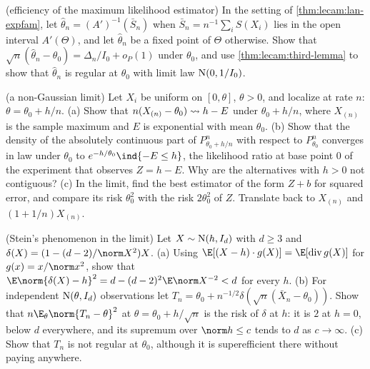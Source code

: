 \begin{refsection}
\begin{exercises}
\item \consolidation (efficiency of the maximum likelihood estimator) In the setting of \cref{thm:lecam:lan-expfam}, let $\hat\theta_n=(A')^{-1}(\bar S_n)$ when $\bar S_n=n^{-1}\sum_iS(X_i)$ lies in the open interval $A'(\Theta)$, and let $\hat\theta_n$ be a fixed point of $\Theta$ otherwise. Show that $\sqrt n(\hat\theta_n-\theta_0)=\Delta_n/I_0+o_P(1)$ under $\theta_0$, and use \cref{thm:lecam:third-lemma} to show that $\hat\theta_n$ is regular at $\theta_0$ with limit law $\mathrm{N}(0,1/I_0)$.\label{ex:lecam:mle}

\item \transfer (a non-Gaussian limit) Let $X_i$ be uniform on $[0,\theta]$, $\theta>0$, and localize at rate $n$: $\theta=\theta_0+h/n$. (a) Show that $n(X_{(n)}-\theta_0)\rightsquigarrow h-E$ under $\theta_0+h/n$, where $X_{(n)}$ is the sample maximum and $E$ is exponential with mean $\theta_0$. (b) Show that the density of the absolutely continuous part of $P^n_{\theta_0+h/n}$ with respect to $P^n_{\theta_0}$ converges in law under $\theta_0$ to $e^{-h/\theta_0}\ind\{-E\le h\}$, the likelihood ratio at base point $0$ of the experiment that observes $Z=h-E$. Why are the alternatives with $h>0$ not contiguous? (c) In the limit, find the best estimator of the form $Z+b$ for squared error, and compare its risk $\theta_0^2$ with the risk $2\theta_0^2$ of $Z$. Translate back to $X_{(n)}$ and $(1+1/n)X_{(n)}$.\label{ex:lecam:uniform}

\item \transfer\hard (Stein's phenomenon in the limit) Let $X\sim\mathrm{N}(h,I_d)$ with $d\ge3$ and $\delta(X)=(1-(d-2)/\norm X^2)X$. (a) Using $\E[(X-h)\cdot g(X)]=\E[\operatorname{div}g(X)]$ for $g(x)=x/\norm x^2$, show that $\E\norm{\delta(X)-h}^2=d-(d-2)^2\E\norm X^{-2}<d$ for every $h$. (b) For independent $\mathrm{N}(\theta,I_d)$ observations let $T_n=\theta_0+n^{-1/2}\delta(\sqrt n(\bar X_n-\theta_0))$. Show that $n\E_\theta\norm{T_n-\theta}^2$ at $\theta=\theta_0+h/\sqrt n$ is the risk of $\delta$ at $h$: it is $2$ at $h=0$, below $d$ everywhere, and its supremum over $\norm h\le c$ tends to $d$ as $c\to\infty$. (c) Show that $T_n$ is not regular at $\theta_0$, although it is superefficient there without paying anywhere. \label{ex:lecam:stein}


\end{exercises}
\end{refsection}
